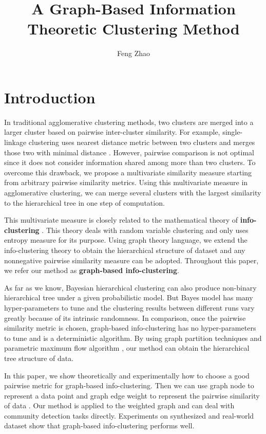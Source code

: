 \documentclass{article}
\title{A Graph-Based Information Theoretic Clustering Method}
\author{
  Feng Zhao
}
\begin{document}

\maketitle

\begin{abstract}

\end{abstract}

\section{Introduction}
In traditional agglomerative clustering methods, two clusters are merged into a larger cluster based on pairwise inter-cluster similarity.  For example, single-linkage clustering uses nearest distance metric between two clusters and merges those two with minimal distance \cite{RN16}.  However, pairwise comparison is not optimal since it does not consider information shared among more than two clusters.  To overcome this drawback, we propose a multivariate similarity measure starting from arbitrary pairwise similarity metrics. Using this multivariate measure in agglomerative clustering, we can merge several clusters with the largest similarity to the hierarchical tree in one step of computation.

This multivariate measure is closely related to the mathematical theory of \textbf{info-clustering} \cite{RN1}. This theory deals with random variable clustering and only uses entropy measure for its purpose. Using graph theory language, we extend the info-clustering theory to obtain the hierarchical structure of dataset and any nonnegative pairwise similarity measure can be adopted. Throughout this paper, we refer our method as \textbf{graph-based info-clustering}.

As far as we know, Bayesian hierarchical clustering \cite{Heller2005Bayesian} can also produce non-binary hierarchical tree under a given probabilistic model. But Bayes model has many hyper-parameters to tune and the clustering results between different runs vary greatly because of its intrinsic randomness. In comparison, once the pairwise similarity metric is chosen, graph-based info-clustering has no hyper-parameters to tune and is a deterministic algorithm. By using graph partition techniques \cite{RN3} and parametric maximum flow algorithm \cite{RN4}, our method can obtain the hierarchical tree structure of data. 

In this paper, we show theoretically and experimentally how to choose a good pairwise metric for graph-based info-clustering. Then we can use graph node to represent a data point and graph edge weight to represent the pairwise similarity of data	. Our method is applied to the weighted graph and can deal with community detection tasks directly. Experiments on synthesized and real-world dataset show that graph-based info-clustering performs well. 
\end{document}
